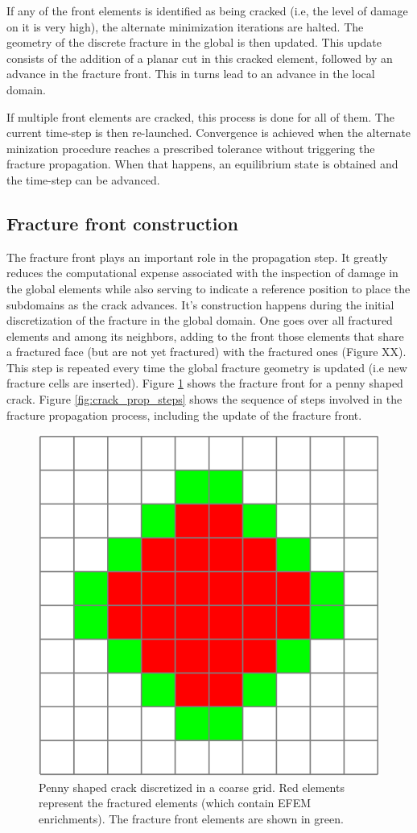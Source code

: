 If any of the front elements is identified as being cracked (i.e, the level of damage on it is very high), the alternate minimization iterations are halted. The geometry of the discrete fracture in the global is then updated. This update consists of the addition of a planar cut in this cracked element, followed by an advance in the fracture front. This in turns lead to an advance in the local domain.

If multiple front elements are cracked, this process is done for all of them. The current time-step is then re-launched. Convergence is achieved when the alternate minization procedure reaches a prescribed tolerance without triggering the fracture propagation. When that happens, an equilibrium state is obtained and the time-step can be advanced.

\subsection{Fracture front construction}\label{sec:front}

The fracture front plays an important role in the propagation step. It greatly reduces the computational expense associated with the inspection of damage in the global elements while also serving to indicate a reference position to place the subdomains as the crack advances. It's construction happens during the initial discretization of the fracture in the global domain. One goes over all fractured elements and among its neighbors, adding to the front those elements that share a fractured face (but are not yet fractured) with the fractured ones (Figure XX). This step is repeated every time the global fracture geometry is updated (i.e new fracture cells are inserted). Figure \ref{fig:crack_front} shows the fracture front for a penny shaped crack. Figure \ref{fig:crack_prop_steps} shows the sequence of steps involved in the fracture propagation process, including the update of the fracture front.

\begin{figure}[h]
    \centering
    \includegraphics[width=0.4\linewidth]{Chapter4/figures/front_penny.png}
    \caption{Penny shaped crack discretized in a coarse grid. Red elements represent the fractured elements (which contain EFEM enrichments). The fracture front elements are shown in green. }
    \label{fig:crack_front}
\end{figure}


